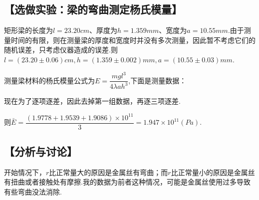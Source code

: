 \documentclass[12pt,a4paper,UTF8]{ctexart}
\begin{document}
\subsection*{【选做实验：梁的弯曲测定杨氏模量】}
矩形梁的长度为$l=23.20cm$、厚度为$h=1.359mm$、宽度为$a=10.55mm$.由于测量时间的有限，则在测量梁的厚度和宽度时并没有多次测量，因此暂不考虑它们的随机误差，只考虑仪器造成的误差.则$l=(23.20\pm0.06)cm,h=(1.359\pm0.002)mm,a=(10.55\pm0.03)mm$.\par
测量梁材料的杨氏模量公式为$E=\dfrac{mgl^3}{4\lambda ah^3}$,下面是测量数据：\par
\begin{table}[htbp]
\centering
\caption{测量梁受外力拉伸后的伸展变化数据表}
\end{table}
现在为了逐项逐差，因此去掉第一组数据，再逐三项逐差.\par
则$\bar E=\dfrac{(1.9778+1.9539+1.9086)\times10^{11}}{3}=1.947\times10^{11}(Pa)$.
\subsection*{【分析与讨论】}
开始情况下，$r$比正常量大的原因是金属丝有弯曲；而$r$比正常量小的原因是金属丝有扭曲或者接触处有摩擦.我的数据为前者这种情况，可能是金属丝使用过多导致有些弯曲没法消除.
\end{document}
